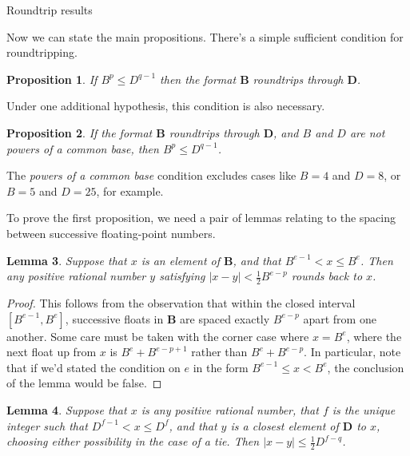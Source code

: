 \documentclass{article}
\theoremstyle{plain}
\newtheorem{lemma}{Lemma}
\newtheorem{proposition}[lemma]{Proposition}
\theoremstyle{definition}
\begin{document}
\begin{section}{Roundtrip results}

Now we can state the main propositions. There's a simple sufficient condition
for roundtripping.

\begin{proposition}
  \label{roundtrip_sufficient_condition}
  If $B^p \le D^{q-1}$ then the format $\mathbf B$ roundtrips through $\mathbf
  D$.
\end{proposition}

Under one additional hypothesis, this condition is also necessary.

\begin{proposition}
  \label{roundtrip_necessary_condition}
  If the format $\mathbf B$ roundtrips through $\mathbf D$, \emph{and} $B$ and
  $D$ are not powers of a common base, then $B^p \le D^{q-1}$.
\end{proposition}

The \emph{powers of a common base} condition excludes cases like $B = 4$ and $D
= 8$, or $B = 5$ and $D = 25$, for example.

To prove the first proposition, we need a pair of lemmas relating to the
spacing between successive floating-point numbers.

\begin{lemma}
  \label{small_gap}
  Suppose that $x$ is an element of $\mathbf B$, and that $B^{e-1} < x \le
  B^e$. Then any positive rational number $y$ satisfying $|x - y| < \frac12
  B^{e-p}$ rounds back to $x$.
\end{lemma}

\begin{proof}
  This follows from the observation that within the closed interval $[B^{e-1},
    B^e]$, successive floats in $\mathbf B$ are spaced exactly $B^{e-p}$ apart
  from one another. Some care must be taken with the corner case where $x=B^e$,
  where the next float up from $x$ is $B^e + B^{e-p+1}$ rather than $B^e +
  B^{e-p}$. In particular, note that if we'd stated the condition on $e$ in the
  form $B^{e-1} \le x < B^e$, the conclusion of the lemma would be false.
\end{proof}

\begin{lemma}
  \label{large_gap}
  Suppose that $x$ is any positive rational number, that $f$ is the unique
  integer such that $D^{f-1} < x \le D^f$, and that $y$ is a closest element of
  $\mathbf D$ to $x$, choosing either possibility in the case of a tie. Then
  $|x - y| \le \frac12 D^{f-q}$.
\end{lemma}


\end{section}
\end{document}
